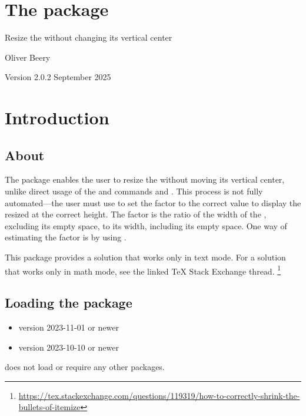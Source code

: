 \documentclass{beery}
\begin{document}
\section*{\Large The  package}

Resize the  without changing its vertical center

Oliver Beery

Version 2.0.2 September 2025


\section{Introduction}
\label{sec:intro}

\subsection{About}
\label{subsec:about}

The  package enables the user to resize the  without moving its vertical center, unlike direct usage of the \LaTeXe{} and  commands  and .
This process is not fully automated---the user must use  to set the  factor to the correct value to display the resized  at the correct height.
The  factor is the ratio of the width of the , excluding its empty space, to its width, including its empty space.
One way of estimating the  factor is by using .

This package provides a solution that works only in text mode.
For a solution that works only in math mode, see the linked \TeX{} Stack Exchange thread.%
\footnote{\url{https://tex.stackexchange.com/questions/119319/how-to-correctly-shrink-the-bullets-of-itemize}}

\subsection{Loading the package}
\label{subsec:loading}

\begin{itemize}
  \item \LaTeXe{} version 2023-11-01 or newer
  \item {} version 2023-10-10 or newer
\end{itemize}

 does not load or require any other packages.
\end{document}
